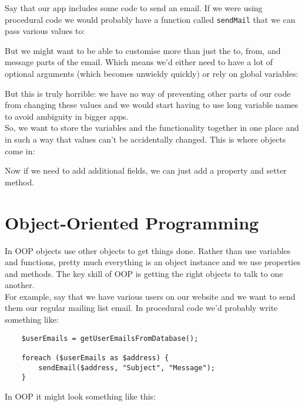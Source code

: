 \pagebreak

Say that our app includes some code to send an email. If we were using procedural code we would probably have a function called \texttt{sendMail} that we can pass various values to:


But we might want to be able to customise more than just the to, from, and message parts of the email. Which means we'd either need to have a lot of optional arguments (which becomes unwieldy quickly) or rely on global variables:


But this is truly horrible: we have no way of preventing other parts of our code from changing these values and we would start having to use long variable names to avoid ambiguity in bigger apps.
\\

So, we want to store the variables and the functionality together in one place and in such a way that values can't be accidentally changed. This is where objects come in:


Now if we need to add additional fields, we can just add a property and setter method.


\section{Object-Oriented Programming}

In OOP objects use other objects to get things done. Rather than use variables and functions, pretty much everything is an object instance and we use properties and methods. The key skill of OOP is getting the right objects to talk to one another.
\\

For example, say that we have various users on our website and we want to send them our regular mailing list email. In procedural code we'd probably write something like:

\begin{verbatim}
    $userEmails = getUserEmailsFromDatabase();

    foreach ($userEmails as $address) {
        sendEmail($address, "Subject", "Message");
    }
\end{verbatim}

In OOP it might look something like this:

